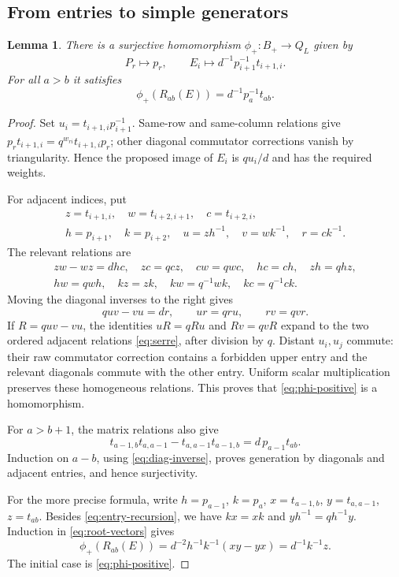 \documentclass[11pt]{article}
\newtheorem{lemma}[theorem]{Lemma}
\theoremstyle{definition}
\theoremstyle{remark}
\begin{document}
\subsection{From entries to simple generators}
\begin{lemma}\label{lem:matrix-to-borel}
There is a surjective homomorphism $\phi_+:B_+\to Q_L$ given by
\begin{equation}\label{eq:phi-positive}
 P_r\longmapsto p_r,\qquad
 E_i\longmapsto d^{-1}p_{i+1}^{-1}t_{i+1,i}.
\end{equation}
For all $a>b$ it satisfies
\begin{equation}\label{eq:root-image}
 \phi_+(R_{ab}(E))=d^{-1}p_a^{-1}t_{ab}.
\end{equation}
\end{lemma}
\begin{proof}
Set $u_i=t_{i+1,i}p_{i+1}^{-1}$. Same-row and same-column relations give
$p_rt_{i+1,i}=q^{w_{ri}}t_{i+1,i}p_r$; other diagonal commutator corrections vanish by triangularity. Hence the proposed image of $E_i$ is $qu_i/d$ and has the required weights.

For adjacent indices, put
\[
 \begin{gathered}
 z=t_{i+1,i},\quad w=t_{i+2,i+1},\quad c=t_{i+2,i},\\
 h=p_{i+1},\quad k=p_{i+2},\quad u=zh^{-1},\quad v=wk^{-1},\quad r=ck^{-1}.
 \end{gathered}
\]
The relevant relations are
\[
 \begin{gathered}
 zw-wz=dhc,\quad zc=qcz,\quad cw=qwc,\quad hc=ch,\quad zh=qhz,\\
 hw=qwh,\quad kz=zk,\quad kw=q^{-1}wk,\quad kc=q^{-1}ck.
 \end{gathered}
\]
Moving the diagonal inverses to the right gives
\[
 quv-vu=dr,\qquad ur=qru,\qquad rv=qvr.
\]
If $R=quv-vu$, the identities $uR=qRu$ and $Rv=qvR$ expand to the two ordered adjacent relations \eqref{eq:serre}, after division by $q$. Distant $u_i,u_j$ commute: their raw commutator correction contains a forbidden upper entry and the relevant diagonals commute with the other entry. Uniform scalar multiplication preserves these homogeneous relations. This proves that \eqref{eq:phi-positive} is a homomorphism.

For $a>b+1$, the matrix relations also give
\begin{equation}\label{eq:entry-recursion}
 t_{a-1,b}t_{a,a-1}-t_{a,a-1}t_{a-1,b}=d\,p_{a-1}t_{ab}.
\end{equation}
Induction on $a-b$, using \eqref{eq:diag-inverse}, proves generation by diagonals and adjacent entries, and hence surjectivity.

For the more precise formula, write $h=p_{a-1}$, $k=p_a$, $x=t_{a-1,b}$, $y=t_{a,a-1}$, $z=t_{ab}$. Besides \eqref{eq:entry-recursion}, we have $kx=xk$ and $yh^{-1}=qh^{-1}y$. Induction in \eqref{eq:root-vectors} gives
\[
 \phi_+(R_{ab}(E))=d^{-2}h^{-1}k^{-1}(xy-yx)=d^{-1}k^{-1}z.
\]
The initial case is \eqref{eq:phi-positive}.
\end{proof}
\end{document}
